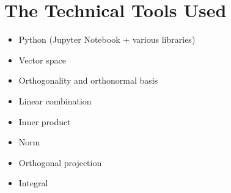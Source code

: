 \section{The Technical Tools Used}
\begin{itemize}
    \item Python (Jupyter Notebook + various libraries)
    \item Vector space
    \item Orthogonality and orthonormal basis
    \item Linear combination
    \item Inner product
    \item Norm
    \item Orthogonal projection
    \item Integral
\end{itemize}
